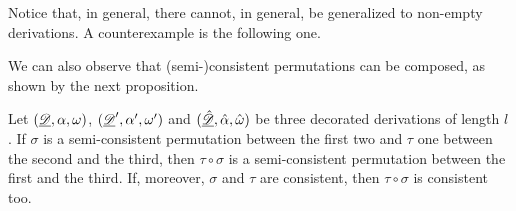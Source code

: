 \begin{example}Notice that, in general, there cannot, in general, be generalized to non-empty derivations. A counterexample is the following one.
\end{example}



We can also observe that (semi-)consistent permutations can be composed, as shown by the next proposition.

\begin{proposition}\label{rem:comp}  Let $(\underline{\mathscr{D}}, \alpha, \omega)$, $(\underline{\mathscr{D}}', \alpha', \omega')$ and $(\underline{\mathscr{\hat{D}}}, \hat{\alpha}, \hat{\omega})$ be three decorated derivations of length $l$. If $\sigma$ is a semi-consistent permutation between the first two and $\tau$ one between the second and the third, then $\tau \circ \sigma$ is a semi-consistent permutation between the first and the third. If, moreover, $\sigma$ and $\tau$ are consistent, then $\tau \circ \sigma$ is consistent too.
\end{proposition} 	


